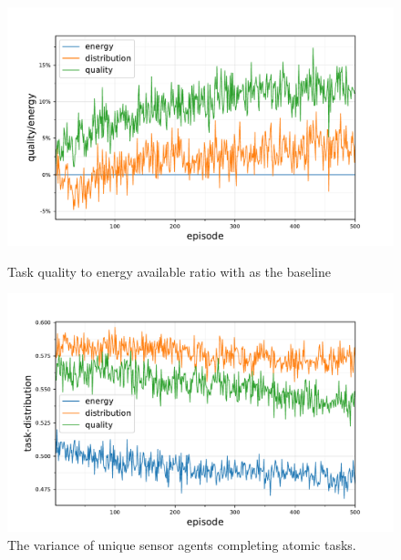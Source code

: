 \begin{figure}[ht]
	\begin{minipage}{.49\textwidth}
		\centering
		\includegraphics[width=1.0\linewidth,trim={25pt 0pt 50pt 0pt},clip]{5.19_ctv-quality-energy-baseline-comparison}
		\caption{Task quality to energy available ratio \newline  with \algorithmEnergy{}{} as the baseline}
		\label{fig:ctv-quality-energy-baseline-comparison}
	\end{minipage}\hfill%
	\begin{minipage}{.49\textwidth}
	\centering
	\includegraphics[width=1.0\linewidth,trim={25pt 0pt 50pt 0pt},clip]{5.19_ctv-task-distribution-comparison}
	\caption{The variance of unique sensor agents completing \newline atomic tasks.}
	\label{fig:ctv-task-distribution-comparison}
\end{minipage}
	\begin{minipage}{.49\textwidth}
		\centering

\end{minipage}
\end{figure}
